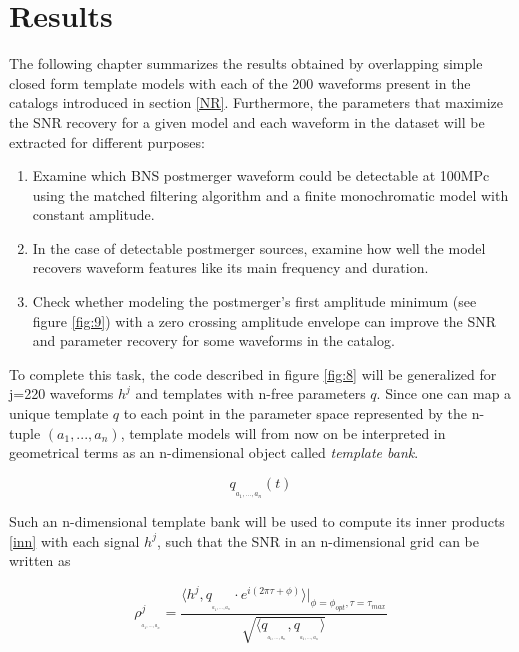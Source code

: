 \chapter{Results}\label{res}

The following chapter summarizes the results obtained by overlapping simple closed form template models with each of the 200 waveforms present in the catalogs introduced in section \ref{NR}. Furthermore, the parameters that maximize the SNR recovery for a given model and each waveform in the dataset will be extracted for different purposes:

\begin{enumerate}
\item Examine which BNS postmerger waveform could be detectable at 100MPc using the matched filtering algorithm and a finite monochromatic model with constant amplitude.

\item In the case of detectable postmerger sources, examine how well the model recovers waveform features like its main frequency and duration.

\item Check whether modeling the postmerger's first amplitude minimum (see figure \ref{fig:9}) with a zero crossing amplitude envelope can improve the SNR and parameter recovery for some waveforms in the catalog.

\end{enumerate}


To complete this task, the code described in figure \ref{fig:8} will be generalized for j=220 waveforms $h^j$ and templates with n-free parameters $q$. Since one can map a unique template $q$ to each point in the parameter space represented by the n-tuple $(a_1,...,a_n)$, template models will from now on be interpreted in geometrical terms as an n-dimensional object called \textit{template bank}. 

\begin{equation}\label{ndim}
q_{_{a_1,...,a_n}}(t)
\end{equation}

Such an n-dimensional template bank will be used to compute its inner products \ref{inn} with each signal $h^j$, such that the SNR in an n-dimensional grid can be written as 

\begin{equation}\label{pul}
\rho^j_{_{_{a_1,...,a_n}}} = \frac{\langle h^j, q_{_{_{a_1,...,a_n}}}\cdot e^{i(2\pi \tau+\phi)}\rangle \bigg\rvert_{\phi =\phi_{opt},\tau =\tau_{max}}}{\sqrt{\langle  q_{_{_{a_1,...,a_n}}},q_{_{_{a_1,...,a_n}}} \rangle}}
\end{equation}


